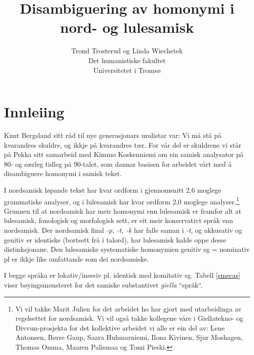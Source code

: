 \documentclass[a4paper,norsk]{article}
\begin{document}
\title{Disambiguering av homonymi i nord- og lulesamisk}

\author{Trond Trosterud og Linda Wiechetek\\
Det humanistiske fakultet\\
Universitetet i Tromsø}

\maketitle



\section{Innleiing} 


Knut Bergsland sitt råd til nye generasjonars uralistar var: Vi må stå på kvarandres skuldre, og ikkje på kvarandres tær. For vår del er skuldrene vi står på Pekka sitt samarbeid med Kimmo Koskenniemi om ein samisk analysator på 80- og særleg tidleg på 90-talet, som dannar basisen for arbeidet vårt med å disambiguere homonymi i samisk tekst.  

I nordsamisk løpande tekst har kvar ordform i gjennomsnitt 2,6 moglege grammatiske analyser, og i lulesamisk har kvar ordform 2,0 moglege analyser.\footnote{Vi vil takke Marit Julien for det arbeidet ho har gjort med utarbeidinga av regelsettet for nordsamisk. Vi vil også takke kollegene våre i Giellatekno- og Divvun-prosjekta for det kollektive arbeidet vi alle er ein del av: Lene Antonsen, Børre Gaup, Saara Huhmarniemi, Ilona Kivinen, Sjur Moshagen, Thomas Omma, Maaren Palismaa og Tomi Pieski. } Grunnen til at nordsamisk har meir homonymi enn lulesamisk er framfor alt at lulesamisk, fonologisk og morfologisk sett, er eit meir konservativt språk enn nordsamisk. Der nordsamisk final \textit{-p, -t, -k} har falle saman i \textit{-t}, og akkusativ og genitiv er identiske (bortsett frå i talord), har lulesamisk halde oppe desse distinksjonane. Den lulesamiske systematiske homonymien genitiv sg = nominativ pl er ikkje like omfattande som dei nordsamiske. %

I begge språka er lokativ/inessiv pl. identisk med komitativ sg. Tabell \ref{smecas}  viser bøyingsmønsteret for det samiske substantivet \textit{giella} ``språk``.%
\end{document}
